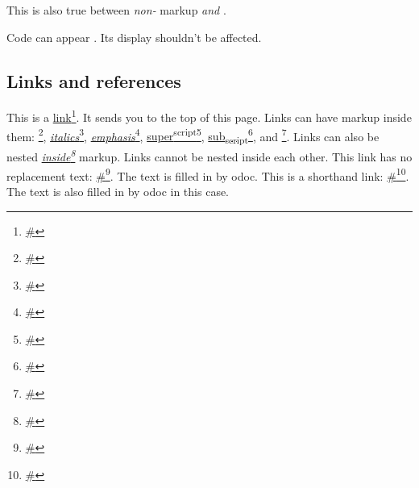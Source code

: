 \begin{flushleft}\end{flushleft}%
This is also true between \emph{non-} markup \emph{and} .

\begin{flushleft}\end{flushleft}%
Code can appear . Its display shouldn't be affected.

\subsection{Links and references\label{links-and-references}}%
\begin{flushleft}\end{flushleft}%
This is a \href{\#}{link}\footnote{\url{\#}}. It sends you to the top of this page. Links can have markup inside them: \href{\#}{}\footnote{\url{\#}}, \href{\#}{\emph{italics}}\footnote{\url{\#}}, \href{\#}{\emph{emphasis}}\footnote{\url{\#}}, \href{\#}{super\textsuperscript{script}}\footnote{\url{\#}}, \href{\#}{sub\textsubscript{script}}\footnote{\url{\#}}, and \href{\#}{}\footnote{\url{\#}}. Links can also be nested \emph{\href{\#}{inside}\footnote{\url{\#}}} markup. Links cannot be nested inside each other. This link has no replacement text: \href{\#}{\#}\footnote{\url{\#}}. The text is filled in by odoc. This is a shorthand link: \href{\#}{\#}\footnote{\url{\#}}. The text is also filled in by odoc in this case.

